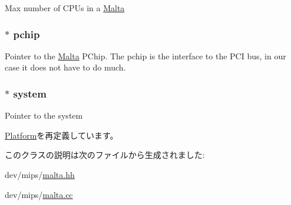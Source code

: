 \label{classMalta_ab15ce4af0fe2c47746a30bafa34ced51}
Max number of CPUs in a \hyperlink{classMalta}{Malta} \hypertarget{classMalta_ac4b4664e7d3bda2f7f4af6fdfc5e246c}{
\subsubsection[{pchip}]{$\ast$ {\bf pchip}}}
\label{classMalta_ac4b4664e7d3bda2f7f4af6fdfc5e246c}
Pointer to the \hyperlink{classMalta}{Malta} PChip. The pchip is the interface to the PCI bus, in our case it does not have to do much. \hypertarget{classMalta_af27ccd765f13a4b7bd119dc7579e2746}{
\subsubsection[{system}]{$\ast$ {\bf system}}}
\label{classMalta_af27ccd765f13a4b7bd119dc7579e2746}
Pointer to the system 

\hyperlink{classPlatform_af27ccd765f13a4b7bd119dc7579e2746}{Platform}を再定義しています。

このクラスの説明は次のファイルから生成されました:\begin{DoxyCompactItemize}
\item 
dev/mips/\hyperlink{malta_8hh}{malta.hh}\item 
dev/mips/\hyperlink{malta_8cc}{malta.cc}\end{DoxyCompactItemize}
